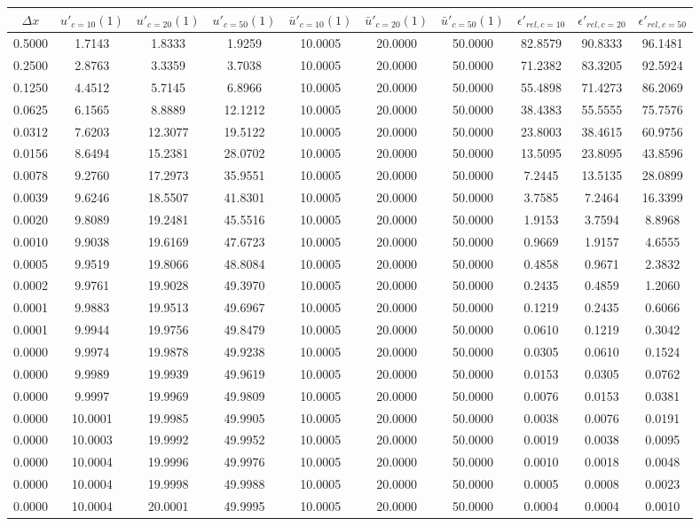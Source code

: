 \begin{tabular}{|c|c|c|c|c|c|c|c|c|c|}
\hline
\textbf{$\Delta x$}&\textbf{$u'_{c=10}(1)$}&\textbf{$u'_{c=20}(1)$}&\textbf{$u'_{c=50}(1)$}&\textbf{$\bar{u}'_{c=10}(1)$}&\textbf{$\bar{u}'_{c=20}(1)$}&\textbf{$\bar{u}'_{c=50}(1)$}&\textbf{$\epsilon'_{rel,c=10}$}&\textbf{$\epsilon'_{rel,c=20}$}&\textbf{$\epsilon'_{rel,c=50}$}\\\hline
0.5000&1.7143&1.8333&1.9259&10.0005&20.0000&50.0000&82.8579&90.8333&96.1481\\\hline
0.2500&2.8763&3.3359&3.7038&10.0005&20.0000&50.0000&71.2382&83.3205&92.5924\\\hline
0.1250&4.4512&5.7145&6.8966&10.0005&20.0000&50.0000&55.4898&71.4273&86.2069\\\hline
0.0625&6.1565&8.8889&12.1212&10.0005&20.0000&50.0000&38.4383&55.5555&75.7576\\\hline
0.0312&7.6203&12.3077&19.5122&10.0005&20.0000&50.0000&23.8003&38.4615&60.9756\\\hline
0.0156&8.6494&15.2381&28.0702&10.0005&20.0000&50.0000&13.5095&23.8095&43.8596\\\hline
0.0078&9.2760&17.2973&35.9551&10.0005&20.0000&50.0000&7.2445&13.5135&28.0899\\\hline
0.0039&9.6246&18.5507&41.8301&10.0005&20.0000&50.0000&3.7585&7.2464&16.3399\\\hline
0.0020&9.8089&19.2481&45.5516&10.0005&20.0000&50.0000&1.9153&3.7594&8.8968\\\hline
0.0010&9.9038&19.6169&47.6723&10.0005&20.0000&50.0000&0.9669&1.9157&4.6555\\\hline
0.0005&9.9519&19.8066&48.8084&10.0005&20.0000&50.0000&0.4858&0.9671&2.3832\\\hline
0.0002&9.9761&19.9028&49.3970&10.0005&20.0000&50.0000&0.2435&0.4859&1.2060\\\hline
0.0001&9.9883&19.9513&49.6967&10.0005&20.0000&50.0000&0.1219&0.2435&0.6066\\\hline
0.0001&9.9944&19.9756&49.8479&10.0005&20.0000&50.0000&0.0610&0.1219&0.3042\\\hline
0.0000&9.9974&19.9878&49.9238&10.0005&20.0000&50.0000&0.0305&0.0610&0.1524\\\hline
0.0000&9.9989&19.9939&49.9619&10.0005&20.0000&50.0000&0.0153&0.0305&0.0762\\\hline
0.0000&9.9997&19.9969&49.9809&10.0005&20.0000&50.0000&0.0076&0.0153&0.0381\\\hline
0.0000&10.0001&19.9985&49.9905&10.0005&20.0000&50.0000&0.0038&0.0076&0.0191\\\hline
0.0000&10.0003&19.9992&49.9952&10.0005&20.0000&50.0000&0.0019&0.0038&0.0095\\\hline
0.0000&10.0004&19.9996&49.9976&10.0005&20.0000&50.0000&0.0010&0.0018&0.0048\\\hline
0.0000&10.0004&19.9998&49.9988&10.0005&20.0000&50.0000&0.0005&0.0008&0.0023\\\hline
0.0000&10.0004&20.0001&49.9995&10.0005&20.0000&50.0000&0.0004&0.0004&0.0010\\\hline
\end{tabular}
